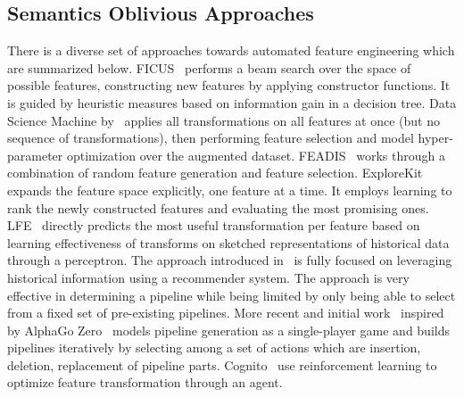 \documentclass[sigconf]{acmart}
\begin{document}
\subsection{Semantics Oblivious Approaches}
\label{autofe_nonsem}
There is a diverse set of approaches towards automated feature engineering which are summarized below.
FICUS~\cite{MarkovitchRosenstein02} performs a beam search over the space of possible features, constructing new features by applying constructor functions. It is guided by heuristic measures based on information gain in a decision tree.
Data Science Machine by~\cite{kanter:dsm} applies all transformations on all features at once (but no sequence of transformations), then performing feature selection and model hyper-parameter optimization over the augmented dataset. FEADIS~\cite{DorReich12} works through a combination of random feature generation and feature selection. 
ExploreKit~\cite{DBLP:conf/icdm/KatzSS16} expands the feature space explicitly, one feature at a time. It employs learning to rank the newly constructed features and evaluating the most promising ones. 
LFE~\cite{lfe} directly predicts the most useful transformation per feature based on learning effectiveness of transforms on sketched representations of historical data through a perceptron. 
The approach introduced in~\cite{recommendersystem2018} is fully focused on leveraging historical information using a recommender system. The approach is very effective in determining a pipeline while being limited by only being able to select from a fixed set of pre-existing pipelines.
More recent and initial work~\cite{alphad3m} inspired by AlphaGo Zero~\cite{alphazero} models pipeline generation as a single-player game and builds pipelines iteratively by selecting among a set of actions which are insertion, deletion, replacement of pipeline parts.
Cognito~\cite{khurana2018feature,khurana2016cognito} use reinforcement learning to optimize feature transformation through an agent.
\end{document}
